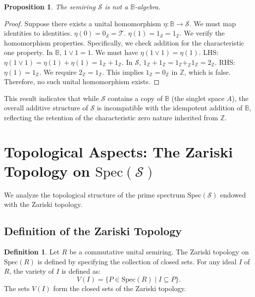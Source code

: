 \documentclass[11pt, a4paper]{article}
\theoremstyle{plain}
\newtheorem{proposition}[theorem]{Proposition}
\theoremstyle{definition}
\newtheorem{definition}[theorem]{Definition}
\numberwithin{equation}{section}
\newcommand{\Z}{\mathbb{Z}}
\newcommand{\Tobj}{\mathcal{T}} %
\newcommand{\SemiringS}{\mathcal{S}}
\newcommand{\Spec}{\mathrm{Spec}}
\newcommand{\Bool}{\mathbb{B}}
\begin{document}
\begin{proposition}\label{prop:S_not_B_algebra}
The semiring $\SemiringS$ is not a $\Bool$-algebra.
\end{proposition}
\begin{proof}
Suppose there exists a unital homomorphism $\eta: \Bool \to \SemiringS$.
We must map identities to identities.
$\eta(0) = 0_{\SemiringS} = \Tobj$. $\eta(1) = 1_{\SemiringS} = 1_{\Z}$.
We verify the homomorphism properties. Specifically, we check addition for the characteristic one property.
In $\Bool$, $1\lor 1=1$.
We must have $\eta(1\lor 1) = \eta(1)$.
LHS: $\eta(1\lor 1) = \eta(1)+\eta(1) = 1_{\Z}+1_{\Z}$.
In $\SemiringS$, $1_{\Z}+1_{\Z} = 1_{\Z}+_{\Z} 1_{\Z} = 2_{\Z}$.
RHS: $\eta(1)=1_{\Z}$.
We require $2_{\Z}=1_{\Z}$. This implies $1_{\Z}=0_{\Z}$ in $\Z$, which is false.
Therefore, no such unital homomorphism exists.
\end{proof}

This result indicates that while $\SemiringS$ contains a copy of $\Bool$ (the singlet space $A$), the overall additive structure of $\SemiringS$ is incompatible with the idempotent addition of $\Bool$, reflecting the retention of the characteristic zero nature inherited from $\Z$.

\section{Topological Aspects: The Zariski Topology on \texorpdfstring{$\Spec(\SemiringS)$}{Spec(S)}}

We analyze the topological structure of the prime spectrum $\Spec(\SemiringS)$ endowed with the Zariski topology.

\subsection{Definition of the Zariski Topology}

\begin{definition}
Let $R$ be a commutative unital semiring. The Zariski topology on $\Spec(R)$ is defined by specifying the collection of closed sets. For any ideal $I$ of $R$, the variety of $I$ is defined as:
\begin{equation}
    V(I) = \{P \in \Spec(R) \mid I \subseteq P\}.
\end{equation}
The sets $V(I)$ form the closed sets of the Zariski topology.
\end{definition}
\end{document}
